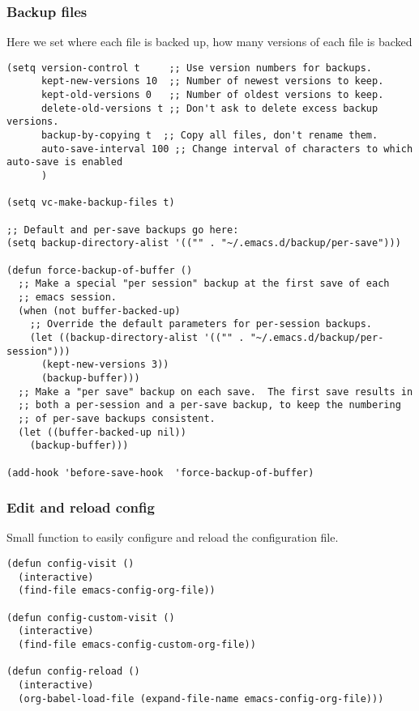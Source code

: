 \documentclass[11pt]{article}
\begin{document}
\subsubsection{Backup files}
\label{sec:org9fb9670}
Here we set where each file is backed up, how many versions of each file is backed
\begin{verbatim}
(setq version-control t     ;; Use version numbers for backups.
      kept-new-versions 10  ;; Number of newest versions to keep.
      kept-old-versions 0   ;; Number of oldest versions to keep.
      delete-old-versions t ;; Don't ask to delete excess backup versions.
      backup-by-copying t  ;; Copy all files, don't rename them.
      auto-save-interval 100 ;; Change interval of characters to which auto-save is enabled
      )

(setq vc-make-backup-files t)

;; Default and per-save backups go here:
(setq backup-directory-alist '(("" . "~/.emacs.d/backup/per-save")))

(defun force-backup-of-buffer ()
  ;; Make a special "per session" backup at the first save of each
  ;; emacs session.
  (when (not buffer-backed-up)
    ;; Override the default parameters for per-session backups.
    (let ((backup-directory-alist '(("" . "~/.emacs.d/backup/per-session")))
	  (kept-new-versions 3))
      (backup-buffer)))
  ;; Make a "per save" backup on each save.  The first save results in
  ;; both a per-session and a per-save backup, to keep the numbering
  ;; of per-save backups consistent.
  (let ((buffer-backed-up nil))
    (backup-buffer)))

(add-hook 'before-save-hook  'force-backup-of-buffer)
\end{verbatim}
\subsubsection{Edit and reload config}
\label{sec:org0dd5853}
Small function to easily configure and reload the configuration file.

\begin{verbatim}
(defun config-visit ()
  (interactive)
  (find-file emacs-config-org-file))

(defun config-custom-visit ()
  (interactive)
  (find-file emacs-config-custom-org-file))

(defun config-reload ()
  (interactive)
  (org-babel-load-file (expand-file-name emacs-config-org-file)))
\end{verbatim}
\end{document}
